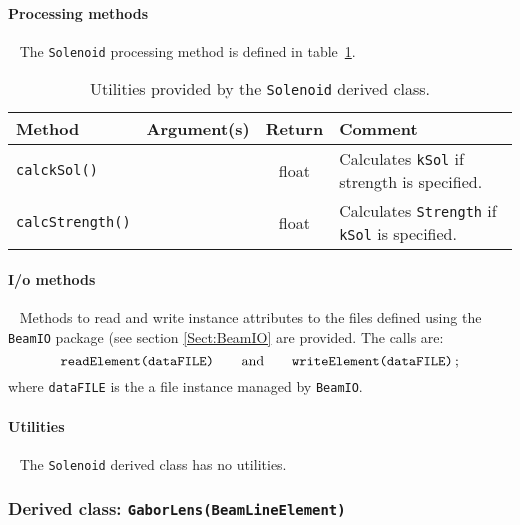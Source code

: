 \paragraph{Processing methods} ~\newline
\noindent
The \texttt{Solenoid} processing method is defined in
table~\ref{Tab:Slnd:Methods}.
\begin{table}[h]
  \caption{
    Utilities provided by the \texttt{Solenoid} derived
    class. 
  }
  \label{Tab:Slnd:Methods}
  \begin{center}
    \begin{tabular}{|l|c|c|p{7cm}|}
      \hline
      \textbf{Method} & \textbf{Argument(s)} & \textbf{Return} & \textbf{Comment}                      \\
      \hline
      \texttt{calckSol()}     &  & float & Calculates \texttt{kSol} if strength is specified.          \\
      \texttt{calcStrength()} &  & float & Calculates \texttt{Strength} if \texttt{kSol} is specified. \\
      \hline
    \end{tabular}
  \end{center}
\end{table}

\paragraph{I/o methods} ~\newline
\noindent
Methods to read and write instance attributes to the files defined
using the \texttt{BeamIO} package (see section \ref{Sect:BeamIO} are
provided.
The calls are:
\begin{equation}
  \texttt{readElement(dataFILE)} \quad \quad {\rm and }
      \quad \quad \texttt{writeElement(dataFILE)} \,; \nonumber
\end{equation}
where \texttt{dataFILE} is the a file instance managed by \texttt{BeamIO}.

\paragraph{Utilities} ~\newline
\noindent
The \texttt{Solenoid} derived class has no utilities.

\FloatBarrier

\subsubsection{Derived class: \texttt{GaborLens(BeamLineElement)}}

